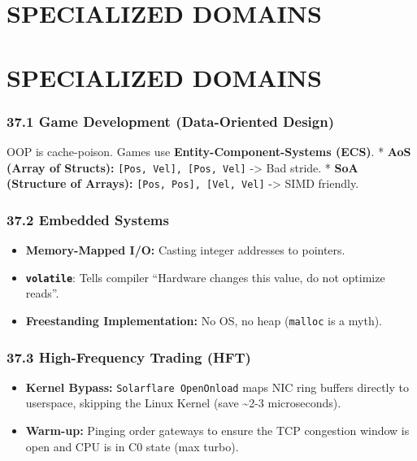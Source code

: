 \hypertarget{specialized-domains}{%
\chapter{SPECIALIZED DOMAINS}\label{specialized-domains}}

\hypertarget{specialized-domains-1}{%
\chapter{SPECIALIZED DOMAINS}\label{specialized-domains-1}}

\hypertarget{game-development-data-oriented-design}{%
\subsection{37.1 Game Development (Data-Oriented
Design)}\label{game-development-data-oriented-design}}

OOP is cache-poison. Games use \textbf{Entity-Component-Systems (ECS)}.
* \textbf{AoS (Array of Structs):}
\passthrough{\lstinline![Pos, Vel], [Pos, Vel]!} -\textgreater{} Bad
stride. * \textbf{SoA (Structure of Arrays):}
\passthrough{\lstinline![Pos, Pos], [Vel, Vel]!} -\textgreater{} SIMD
friendly.

\hypertarget{embedded-systems}{%
\subsection{37.2 Embedded Systems}\label{embedded-systems}}

\begin{itemize}
\tightlist
\item
  \textbf{Memory-Mapped I/O:} Casting integer addresses to pointers.
\item
  \textbf{\passthrough{\lstinline!volatile!}}: Tells compiler ``Hardware
  changes this value, do not optimize reads''.
\item
  \textbf{Freestanding Implementation:} No OS, no heap
  (\passthrough{\lstinline!malloc!} is a myth).
\end{itemize}

\hypertarget{high-frequency-trading-hft}{%
\subsection{37.3 High-Frequency Trading
(HFT)}\label{high-frequency-trading-hft}}

\begin{itemize}
\tightlist
\item
  \textbf{Kernel Bypass:}
  \passthrough{\lstinline!Solarflare OpenOnload!} maps NIC ring buffers
  directly to userspace, skipping the Linux Kernel (save
  \textasciitilde2-3 microseconds).
\item
  \textbf{Warm-up:} Pinging order gateways to ensure the TCP congestion
  window is open and CPU is in C0 state (max turbo).
\end{itemize}

